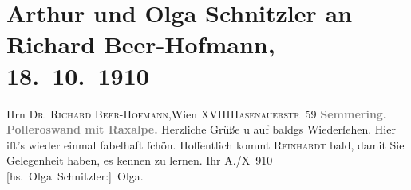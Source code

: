 

         
         \renewcommand{\erwaehntePersonen}{Personen: Richard Beer-Hofmann, Max Reinhardt}
         \renewcommand{\erwaehnteOrte}{Orte: Hasenauerstraße, Polleroswand, Rax, Semmering, Wien, XVIII., Währing}
         \renewcommand{\erwaehnteWerke}{}
               \section[Arthur und Olga Schnitzler an Richard Beer-Hofmann, 18. 10. 1910]{ Arthur und Olga Schnitzler an Richard Beer-Hofmann,
               18. 10. 1910}\nopagebreak{}\rehead{ }\begin{ledgroupsized}[t]{13cm}\normalsize\beginnumbering \toendnotes[C]{\smallbreak\pagebreak[2]} 
\pstart{}{\pb}Hrn \textsc{Dr. Richard
                     Beer-Hofmann,}\pend{}\pstart{}Wien XVIII\pend{}\pstart{}\textsc{Hasenauerstr 59}\pend{}{\bigskip}\pstart
           \noindent{}\centering{}\textcolor{gray}{\textbf{{\pb}Semmering.{ }Polleroswand mit Raxalpe.}}\pend
           \pstart
           {\pb}Herzliche Grüße u auf baldgs Wiederſehen. Hier iſt’s
               wieder einmal fabelhaft ſchön. Hoffentlich kommt \textsc{Reinhardt} bald, damit Sie Gelegenheit haben, es kennen zu lernen.\pend
           \pstart Ihr \spacefill\mbox{A.}\pend{}/X 910\pend
           \pstart \spacefill\mbox{{[}hs. Olga Schnitzler:{]} Olga.}\pend{}
         
         \endnumbering{}\end{ledgroupsized}  \newcommand{\dateiname}{L01966}\newcommand{\titel}{Arthur und Olga Schnitzler an Richard Beer-Hofmann, 18. 10. 1910}\newcommand{\editorInnen}{Martin Anton Müller und Gerd-Hermann Susen}
      